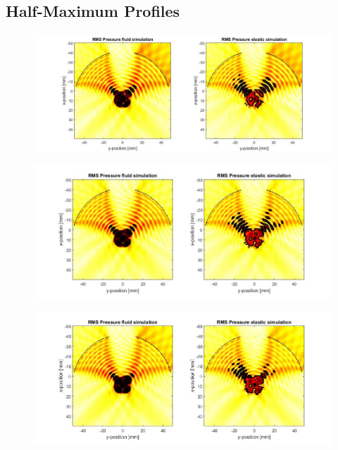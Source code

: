 \documentclass[10pt,a4paper]{article}
\begin{document}
\subsection{Half-Maximum Profiles}

\begin{figure}[H]\label{comp_200kHz}
\hspace*{-4cm}                                                    
\includegraphics[scale=0.55]{comp_200kHz}
\end{figure}
\begin{figure}[H]\label{comp_210kHz}
\hspace*{-4cm}                                                    
\includegraphics[scale=0.6]{comp_210kHz}
\end{figure}
\begin{figure}[H]\label{comp_220kHz}
\hspace*{-4cm}                                                    
\includegraphics[scale=0.6]{comp_220kHz}
\end{figure}
\end{document}
